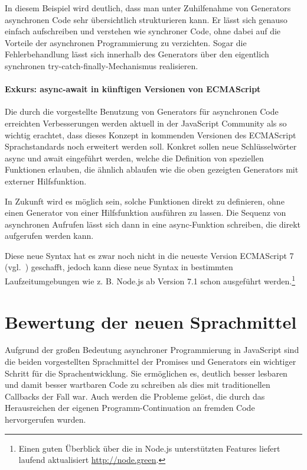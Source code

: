 \documentclass[
11pt, %
a4paper, %
oneside, %
pdfspacing, %
headinclude,
BCOR5mm, %
ngerman, %
bibtotocnumbered,
]{scrartcl}
\begin{document}
		In diesem Beispiel wird deutlich, dass man unter Zuhilfenahme von Generators asynchronen Code sehr übersichtlich strukturieren kann. Er lässt sich genauso einfach aufschreiben und verstehen wie synchroner Code, ohne dabei auf die Vorteile der asynchronen Programmierung zu verzichten. Sogar die Fehlerbehandlung lässt sich innerhalb des Generators über den eigentlich synchronen \textsf{try-catch-finally}-Mechanismus realisieren. 
	
		\paragraph{Exkurs: \textsf{async-await} in künftigen Versionen von {ECMA\-Script}}
	
		Die durch die vorgestellte Benutzung von Generators  für asynchronen Code  erreichten Verbesserungen werden aktuell in der JavaScript Community als so wichtig erachtet, dass dieses Konzept in kommenden Versionen des ECMAScript Sprachstandards noch erweitert werden soll. Konkret sollen neue Schlüsselwörter \textsf{async} und \textsf{await} eingeführt werden, welche die Definition von speziellen Funktionen erlauben, die ähnlich ablaufen wie die oben gezeigten Generators mit externer Hilfsfunktion.
		
		In Zukunft wird es möglich sein, solche Funktionen direkt zu definieren, ohne einen Generator von einer Hilfsfunktion ausführen zu lassen. Die Sequenz von asynchronen Aufrufen lässt sich dann in eine \textsf{async}-Funktion schreiben, die direkt aufgerufen werden kann.
		
		
		Diese neue Syntax hat es zwar noch nicht in die neueste Version ECMAScript 7 (vgl.~\citep{EcmaTC39.2016}) geschafft, jedoch kann diese neue Syntax in bestimmten Laufzeitumgebungen wie z. B. Node.js ab Version 7.1 schon ausgeführt werden.\footnote{Einen guten Überblick über die in Node.js unterstützten Features liefert laufend aktualisiert \url{http://node.green}.}	
	
	
\section{Bewertung der neuen Sprachmittel}
	Aufgrund der großen Bedeutung asynchroner Programmierung in JavaScript sind die beiden vorgestellten Sprachmittel der Promises und Generators ein wichtiger Schritt für die Sprachentwicklung. Sie ermöglichen es, deutlich besser lesbaren und damit besser wartbaren Code zu schreiben als dies mit traditionellen Callbacks der Fall war. Auch werden die Probleme gelöst, die durch das Herausreichen der eigenen Programm-Continuation an fremden Code hervorgerufen wurden.
	
\end{document}
